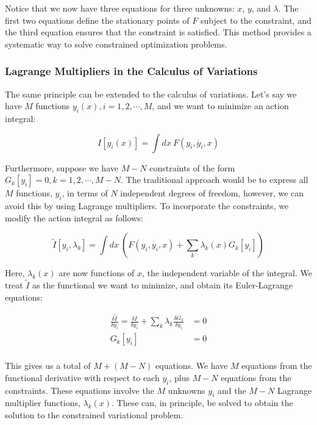Notice that we now have three equations for three unknowns: $x$, $y$, and $\lambda$. The 
first two equations define the stationary points of $F$ subject to the constraint, and 
the third equation ensures that the constraint is satisfied. This method provides a 
systematic way to solve constrained optimization problems.

\subsubsection{Lagrange Multipliers in the Calculus of Variations}

The same principle can be extended to the calculus of variations. Let's say we have $M$ 
functions $y_i\left(x\right), i = 1, 2, \cdots, M$, and we want to minimize an action 
integral:

\begin{equation}
    I[y_i\left(x\right)] = \int dx \ F\left(y_i, \dot{y_i}, x\right)
\end{equation}

Furthermore, suppose we have $M-N$ constraints of the form $G_k[y_i] = 0, k = 1, 2, \cdots, M - N$. 
The traditional approach would be to express all $M$ functions, $y_i$, in terms of $N$ 
independent degrees of freedom, however, we can avoid this by using Lagrange multipliers. 
To incorporate the constraints, we modify the action integral as follows:

\begin{equation}
    \tilde{I}[y_i, \lambda_k] = \int dx \ \left(F\left(y_i, \dot{y_i}, x\right) + \sum_k \lambda_k \left(x\right) G_k[y_i]\right)
\end{equation}

Here, $\lambda_k(x)$ are now functions of $x$, the independent variable of the integral. 
We treat $\tilde{I}$ as the functional we want to minimize, and obtain its Euler-Lagrange 
equations:

\begin{align*}
    \frac{\delta \tilde{I}}{\delta y_i}  = \frac{\delta I}{\delta y_i} + \sum_k \lambda_k \frac{\delta G_k}{\delta y_i} &= 0 \\
    G_k[y_i] &= 0 \\
\end{align*}

This gives us a total of $M + (M - N)$ equations. We have $M$ equations from the 
functional derivative with respect to each $y_i$, plus $M-N$ equations from the 
constraints. These equations involve the $M$ unknowns  $y_i$ and the $M-N$ Lagrange 
multiplier functions, $\lambda_k(x)$. These can, in principle, be solved to obtain the 
solution to the constrained variational problem.

